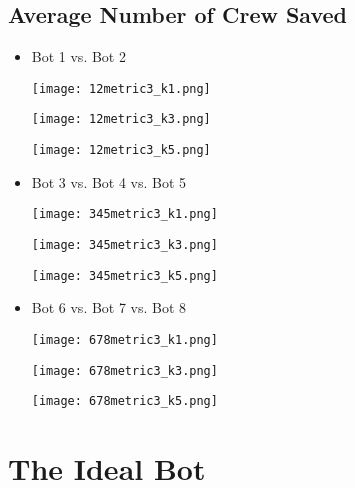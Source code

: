 \documentclass[11pt]{article}
\begin{document}
\subsection{Average Number of Crew Saved}

\begin{itemize}
    \item Bot 1 vs. Bot 2

    \texttt{[image: 12metric3\_k1.png]}

    \texttt{[image: 12metric3\_k3.png]}

    \texttt{[image: 12metric3\_k5.png]}
    
    \item Bot 3 vs. Bot 4 vs. Bot 5

    \texttt{[image: 345metric3\_k1.png]}

    \texttt{[image: 345metric3\_k3.png]}

    \texttt{[image: 345metric3\_k5.png]}
    
    \item Bot 6 vs. Bot 7 vs. Bot 8

    \texttt{[image: 678metric3\_k1.png]}

    \texttt{[image: 678metric3\_k3.png]}

    \texttt{[image: 678metric3\_k5.png]}

\end{itemize}


\section{The Ideal Bot}
\end{document}
